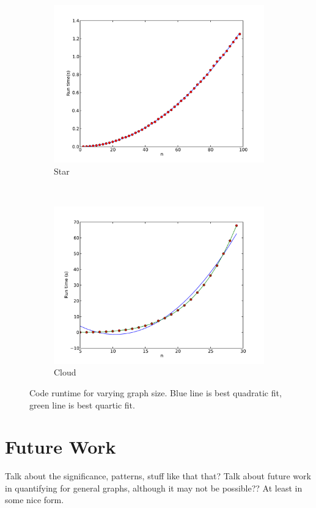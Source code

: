 \documentclass{article}
\begin{document}
\begin{figure}
        \centering
        \begin{subfigure}[b]{0.45\textwidth}
                \centering
                \includegraphics[width=\textwidth]{star_time.pdf}
                \caption{Star}
        \end{subfigure}
        ~ 
        \begin{subfigure}[b]{0.45\textwidth}
                \centering
                \includegraphics[width=\textwidth]{cloud_time.pdf}
                \caption{Cloud}
        \end{subfigure}
        \caption{Code runtime for varying graph size. Blue line is best quadratic fit, green line is best quartic fit.}
        \label{fig:time}
\end{figure}





\section{Future Work}

Talk about the significance, patterns, stuff like that that? Talk
about future work in quantifying for general graphs, although it may
not be possible?? At least in some nice form.



\end{document}
